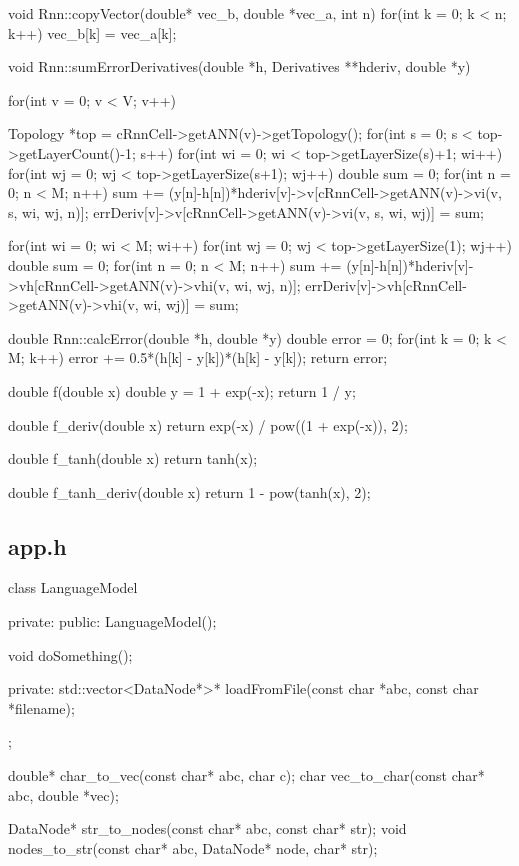 void Rnn::copyVector(double* vec\_b, double *vec\_a, int n){
  for(int k = 0; k < n; k++)
    vec\_b[k] = vec\_a[k];
}

void Rnn::sumErrorDerivatives(double *h, Derivatives **hderiv, double *y){
  for(int v = 0; v < V; v++){
    Topology *top = cRnnCell->getANN(v)->getTopology();
    for(int s = 0; s < top->getLayerCount()-1; s++){
      for(int wi = 0; wi < top->getLayerSize(s)+1; wi++){
        for(int wj = 0; wj < top->getLayerSize(s+1); wj++){
          double sum = 0;
          for(int n = 0; n < M; n++)
            sum += (y[n]-h[n])*hderiv[v]->v[cRnnCell->getANN(v)->vi(v, s, wi, wj, n)];
          errDeriv[v]->v[cRnnCell->getANN(v)->vi(v, s, wi, wj)] = sum;
        }
      }
    }


    for(int wi = 0; wi < M; wi++){
      for(int wj = 0; wj < top->getLayerSize(1); wj++){
        double sum = 0;
        for(int n = 0; n < M; n++)
          sum += (y[n]-h[n])*hderiv[v]->vh[cRnnCell->getANN(v)->vhi(v, wi, wj, n)];
        errDeriv[v]->vh[cRnnCell->getANN(v)->vhi(v, wi, wj)] = sum;
      }
    }
  }
}

double Rnn::calcError(double *h, double *y){
  double error = 0;
  for(int k = 0; k < M; k++)
    error += 0.5*(h[k] - y[k])*(h[k] - y[k]);
  return error;
}

double f(double x){
  double y = 1 + exp(-x);
  return 1 / y;
}

double f\_deriv(double x){
  return exp(-x) / pow((1 + exp(-x)), 2);
}

double f\_tanh(double x){
  return tanh(x);
}

double f\_tanh\_deriv(double x){
  return 1 - pow(tanh(x), 2);
}


\subsection{app.h}


class LanguageModel {
  private:
  public:
    LanguageModel();

    void doSomething();

  private:
    std::vector<DataNode*>* loadFromFile(const char *abc, const char *filename);

};

double* char\_to\_vec(const char* abc, char c);
char vec\_to\_char(const char* abc, double  *vec);

DataNode* str\_to\_nodes(const char* abc, const char* str);
void nodes\_to\_str(const char* abc, DataNode* node, char* str);



